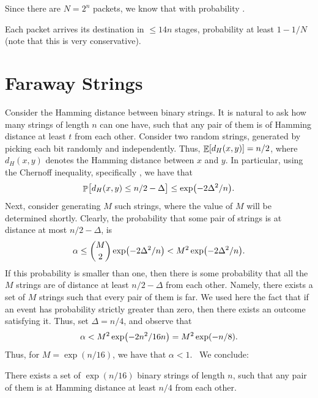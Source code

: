 Since there are $N = 2^n$ packets, we know that with probability
.

\begin{theorem}
    Each packet arrives  its destination in $\leq 14n$ stages, 
    probability at least $1 - 1/N$ (note that this is very
    conservative).
\end{theorem}


\section{Faraway Strings}

Consider the Hamming distance between binary strings. It is natural to
ask how many strings of length $n$ can one have, such that any pair of
them is of Hamming distance at least $t$ from each other. Consider
two random strings, generated by picking each bit randomly and
independently. Thus, $\mathop{\mathbb{E}}\!\left[ {d_H(x,y)} \right] = n/2$, where $d_H(x,y)$ denotes
the Hamming distance between $x$ and $y$. In particular, using the
Chernoff inequality, specifically , we have that
\begin{equation*}
    \Prob{\bigl.d_H(x,y) \leq n/2 - \Delta} \leq \exp\pth{ -2\Delta^2 /n}.
\end{equation*}
Next, consider generating $M$ such strings, where the value of $M$
will be determined shortly. Clearly, the probability that some pair of
strings is at distance at most $n/2 - \Delta$, is
\begin{equation*}
    \alpha \leq \binom{M}{2} \exp\pth{ -2\Delta^2 /n} < M^2 \exp\pth{
       -2\Delta^2 /n}.
\end{equation*}
If this probability is smaller than one, then there is some
probability that all the $M$ strings are of distance at least $n/2 -
\Delta$ from each other. Namely, there exists a set of $M$ strings
such that every pair of them is far. We used here the fact that if an
event has probability strictly greater than zero, then there exists
an outcome satisfying it. Thus, set $\Delta = n/4$, and observe that
\begin{equation*}
    \alpha < M^2 \exp\pth{ -2n^2 /16n} = M^2 \exp\pth{ -n /8}.
\end{equation*}
Thus, for $M = \exp(n/16)$, we have that $\alpha < 1$.%
%
~We conclude:
\begin{lemma}
    There exists a set of $\exp(n/16)$ binary strings of length $n$,
    such that any pair of them is at Hamming distance at least $n/4$
    from each other.
\end{lemma}

